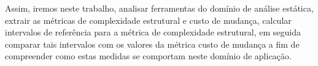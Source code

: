 
Assim, iremos neste trabalho, analisar ferramentas do domínio de análise
estática, extrair as métricas de complexidade estrutural e custo de mudança,
calcular intervalos de referência para a métrica de complexidade estrutural, em
seguida comparar tais intervalos com os valores da métrica custo de mudança a
fim de compreender como estas medidas se comportam neste domínio de aplicação.


%
%
%

%

